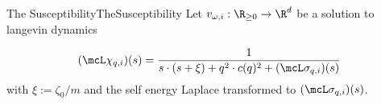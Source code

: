 \begin{mpos}{The Susceptibility}{TheSusceptibility}
    Let $v_{\omega,i}:\R_{\geq 0}\to\R^d$ be a solution to langevin dynamics
    
    \[
        (\mcL\chi_{q,i})(s) = \frac{
            1
        }{
            s\cdot (s + \xi) + q^2\cdot c(q)^2 + (\mcL\sigma_{q,i})(s)
        }
    \]
    with $\xi := \zeta_0/m$ and the self energy Laplace transformed to $(\mcL\sigma_{q,i})(s)$.
\end{mpos}